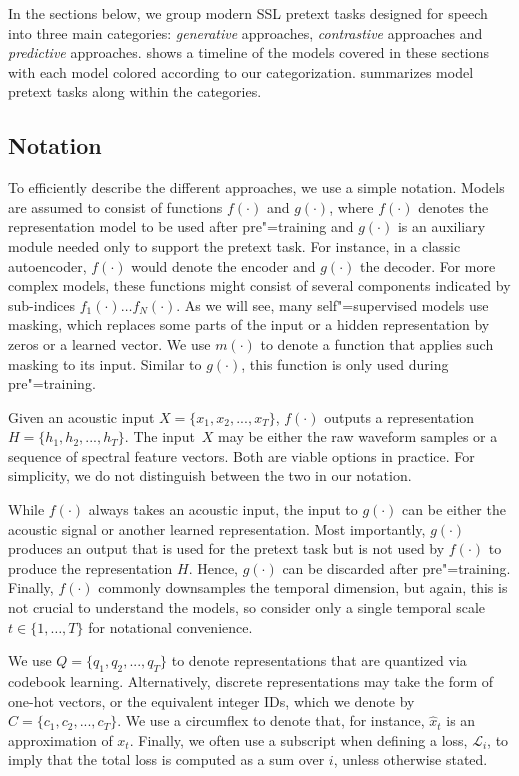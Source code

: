 In the sections below, we group modern SSL pretext tasks designed for speech
into three main categories: \textit{generative} approaches,
\textit{contrastive} approaches and \textit{predictive} approaches. 
 shows a timeline of the models covered in these sections
with each model colored according to our categorization. 
 summarizes model pretext tasks along within the categories.


\subsection{Notation}
\label{sec:notation}

To efficiently describe the different approaches, we use a simple
notation. Models are assumed to consist of functions $f(\cdot)$ and $g(\cdot)$, where $f(\cdot)$  denotes the representation model to be used after pre"=training and $g(\cdot)$ is an auxiliary module needed only to support the pretext task. For instance, in a classic autoencoder, $f(\cdot)$ would denote the encoder and $g(\cdot)$ the decoder. For more complex models, these functions might consist of several components indicated by sub-indices $f_1(\cdot) \dots f_N(\cdot)$. As we will see, many self"=supervised models use masking, which replaces some parts of the input or a hidden representation  by zeros or a learned vector. We use $m(\cdot)$ to denote a function that applies such masking to its input. Similar to $g(\cdot)$, this function is only used during pre"=training. 

Given an acoustic input $X =\{x_1,x_2, ..., x_T\}$, $f(\cdot)$ outputs a representation $H =\{h_1,h_2,...,h_T\}$. The input~$X$ may be either the raw waveform samples or a sequence of spectral feature vectors. Both are viable options in practice. For simplicity, we do not distinguish between the two in our notation.  

While $f(\cdot)$ always takes an acoustic input, the input to $g(\cdot)$ can be either the acoustic signal or another learned representation. Most importantly, $g(\cdot)$ produces an output that is used for the pretext task but is not  used by $f(\cdot)$ to produce the representation $H$. Hence, $g(\cdot)$ can be discarded after pre"=training. Finally, $f(\cdot)$ commonly downsamples the temporal dimension, but again, this is not crucial to understand the models, so consider only a single temporal scale $t\in\{1,\dots, T\}$ for notational convenience.

We use $Q = \{q_1,q_2, ..., q_T\}$ to denote representations that are quantized via codebook learning. Alternatively, discrete representations may take the form of one-hot vectors, or the equivalent integer IDs, which we denote by $C = \{c_1,c_2, ..., c_T\}$. We use a circumflex to denote that, for instance, $\hat{x}_t$ is an approximation of $x_t$. Finally, we often use a subscript when defining a loss, $\mathcal{L}_i$, to imply that the total loss is computed as a sum over $i$, unless otherwise stated.

